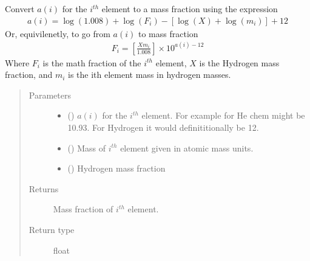 \documentclass[letterpaper,10pt,english]{sphinxmanual}
\begin{document}
\begin{fulllineitems}
\label{\detokenize{pyTOPSScrape.parse:pyTOPSScrape.parse.abundance.a_to_mfrac}}
\sphinxAtStartPar
Convert \(a(i)\) for the \(i^{th}\) element to a mass fraction using the expression
\begin{equation*}
\begin{split}a(i) = \log(1.008) + \log(F_{i}) - \left[\log(X) + \log(m_{i})\right] + 12\end{split}
\end{equation*}
\sphinxAtStartPar
Or, equivilenetly, to go from \(a(i)\) to mass fraction
\begin{equation*}
\begin{split}F_{i} = \left[\frac{X m_{i}}{1.008}\right]\times 10^{a(i)-12}\end{split}
\end{equation*}
\sphinxAtStartPar
Where \(F_{i}\) is the math fraction of the \(i^{th}\) element,
\(X\) is the Hydrogen mass fraction, and \(m_{i}\) is the ith
element mass in hydrogen masses.
\begin{quote}\begin{description}
\item[{Parameters}] \leavevmode\begin{itemize}
\item {} 
\sphinxAtStartPar
{} () \textendash{} \(a(i)\) for the \(i^{th}\) element. For example for He chem might
be 10.93. For Hydrogen it would definititionally be 12.

\item {} 
\sphinxAtStartPar
{} () \textendash{} Mass of \(i^{th}\) element given in atomic mass units.

\item {} 
\sphinxAtStartPar
{} () \textendash{} Hydrogen mass fraction

\end{itemize}

\item[{Returns}] \leavevmode
\sphinxAtStartPar
{} \textendash{} Mass fraction of \(i^{th}\) element.

\item[{Return type}] \leavevmode
\sphinxAtStartPar
float

\end{description}\end{quote}

\end{fulllineitems}
\end{document}
